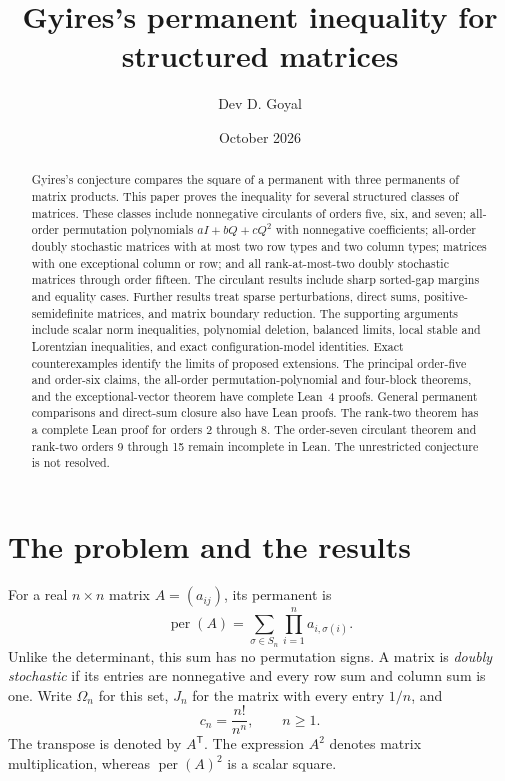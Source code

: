 \documentclass[11pt,a4paper]{article}
\title{Gyires's permanent inequality for structured matrices}
\author{Dev D. Goyal}
\date{October 2026}
\theoremstyle{definition}
\theoremstyle{remark}
\newcommand{\per}{\operatorname{per}}
\newcommand{\T}{\mathsf{T}}
\begin{document}
\maketitle
\begin{abstract}
Gyires's conjecture compares the square of a permanent with three permanents of matrix products.
This paper proves the inequality for several structured classes of matrices.
These classes include nonnegative circulants of orders five, six, and seven;
all-order permutation polynomials $aI+bQ+cQ^2$ with nonnegative coefficients;
all-order doubly stochastic matrices with at most two row types and two column types;
matrices with one exceptional column or row; and all rank-at-most-two doubly stochastic matrices through order fifteen.
The circulant results include sharp sorted-gap margins and equality cases.
Further results treat sparse perturbations, direct sums, positive-semidefinite matrices, and matrix boundary reduction.
The supporting arguments include scalar norm inequalities, polynomial deletion, balanced limits,
local stable and Lorentzian inequalities, and exact configuration-model identities.
Exact counterexamples identify the limits of proposed extensions.
The principal order-five and order-six claims, the all-order permutation-polynomial and four-block theorems, and the exceptional-vector theorem have complete Lean~4 proofs.
General permanent comparisons and direct-sum closure also have Lean proofs.
The rank-two theorem has a complete Lean proof for orders 2 through 8. The order-seven circulant theorem and rank-two orders 9 through 15 remain incomplete in Lean.
The unrestricted conjecture is not resolved.
\end{abstract}

\tableofcontents

\section{The problem and the results}\label{sec:introduction}

For a real $n\times n$ matrix $A=(a_{ij})$, its permanent is
\[
\per(A)=\sum_{\sigma\in S_n}\prod_{i=1}^n a_{i,\sigma(i)}.
\]
Unlike the determinant, this sum has no permutation signs.
A matrix is \emph{doubly stochastic} if its entries are nonnegative and every row sum and column sum is one.
Write $\Omega_n$ for this set, $J_n$ for the matrix with every entry $1/n$, and
\[
c_n=\frac{n!}{n^n},\qquad n\ge1.
\]
The transpose is denoted by $A^\T$.
The expression $A^2$ denotes matrix multiplication, whereas $\per(A)^2$ is a scalar square.
\end{document}
